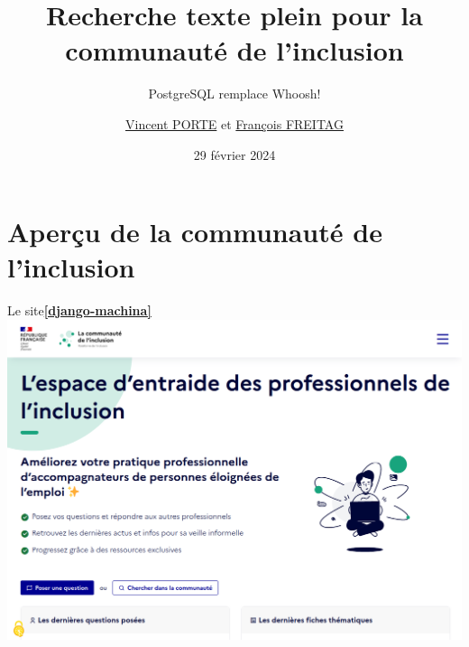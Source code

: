 \documentclass{beamer}
\title{Recherche texte plein pour la communauté de l'inclusion}
\subtitle{PostgreSQL remplace Whoosh!}
\author{\href{vincent@neuralia.co}{Vincent PORTE} et \href{mailto:mail@franek.fr}{François FREITAG}}
\institute{La communauté de l'inclusion \\ GIP Inclusion}
\date{29 février 2024}
\begin{document}

\begin{frame}
	\maketitle %
\end{frame}


\section{Aperçu de la communauté de l'inclusion} %

\begin{frame}{Le site\hfill\href{https://github.com/ellmetha/django-machina/}{\textbf{[django-machina]}}}
    \includegraphics[width=\textwidth]{Images/communaute.png}
\end{frame}
\end{document}

